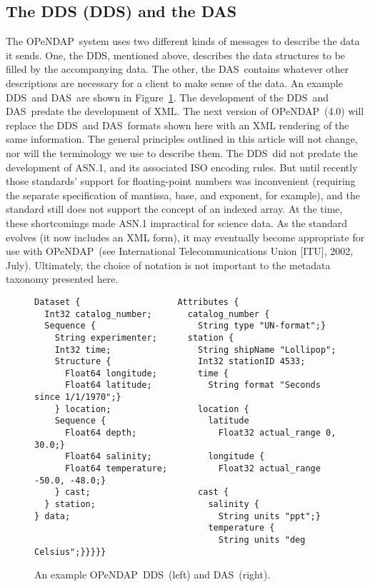 \documentclass{codata}
\newcommand{\opendap}{\ac{OPeNDAP}}
\newcommand{\dds}{\ac{DDS}}
\newcommand{\das}{\ac{DAS}}
\begin{document}
\subsection{The \acl{DDS} (\acs{DDS}) and the \das}
\label{sec:ddsanddas}

The \opendap\ system uses two different kinds of messages to describe
the data it sends.  One, the \dds, mentioned above, describes the data
structures to be filled by the accompanying data.  The other, the
\das\ contains whatever other descriptions are necessary for a client
to make sense of the data.  An example \dds\ and \das\ are shown in
Figure~\ref{fig:ddsanddas}.  The development of the \dds\ and
  \das\ predate the development of XML.  The next version of \opendap\ 
  (4.0) will replace the \dds\ and \das\ formats shown here with an
  XML rendering of the same information.  The general principles
  outlined in this article will not change, nor will the terminology
  we use to describe them.  The \dds\ did not predate the development
  of ASN.1, and its associated ISO encoding rules.  But until recently
  those standards' support for floating-point numbers was inconvenient
  (requiring the separate specification of mantissa, base, and
  exponent, for example), and the standard still does not support the
  concept of an indexed array.  At the time, these shortcomings made
  ASN.1 impractical for science data.  As the standard evolves (it now
  includes an XML form), it may eventually become appropriate for use
  with \opendap\ (see International Telecommunications Union [ITU],
  2002, July).  Ultimately, the choice of notation is not important to the
  metadata taxonomy presented here.

\begin{figure}[htbp]
\begin{verbatim}
Dataset {                   Attributes {
  Int32 catalog_number;       catalog_number {
  Sequence {                    String type "UN-format";}
    String experimenter;      station {
    Int32 time;                 String shipName "Lollipop";
    Structure {                 Int32 stationID 4533;      
      Float64 longitude;        time {
      Float64 latitude;           String format "Seconds since 1/1/1970";}
    } location;                 location {  
    Sequence {                    latitude
      Float64 depth;                Float32 actual_range 0, 30.0;}
      Float64 salinity;           longitude {
      Float64 temperature;          Float32 actual_range -50.0, -48.0;}
    } cast;                     cast {
  } station;                      salinity {
} data;                             String units "ppt";}
                                  temperature {
                                    String units "deg Celsius";}}}}}
\end{verbatim}
  \caption{An example \opendap\ \dds\ (left) and \das\ (right).}
  \label{fig:ddsanddas}
\end{figure}
\end{document}
